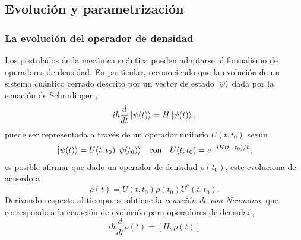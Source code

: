 \subsection{Evolución y parametrización}

\subsubsection{La evolución del operador de densidad}
Los postulados de la mecánica cuántica pueden adaptarse al formalismo de operadores de densidad. En particular, reconociendo que la evolución de un sistema cuántico cerrado descrito por un vector de estado $\ket{\psi}$ dada por la ecuación de Schrodinger \cite{Breuer},
\begin{equation*}
    i\hbar\frac{d}{dt}\ket{\psi(t)}=H\ket{\psi(t)},
\end{equation*}
puede ser representada a través de un operador unitario $U(t,t_{0})$ según
\begin{align*}
    \ket{\psi(t)}=U(t,t_{0})\ket{\psi(t_{0})} && \text{con} && U(t,t_{0})=e^{-iH(t-t_{0})/\hbar}\rlap{,}
\end{align*}
es posible afirmar que dado un operador de densidad $\rho(t_{0})$, este evoluciona de acuerdo a
\begin{equation*}
    \rho(t)=U(t,t_{0})\rho(t_{0})U^{\dagger}(t,t_{0}).
\end{equation*}
Derivando respecto al tiempo, se obtiene la \textit{ecuación de von Neumann}, que corresponde a la ecuación de evolución para operadores de densidad,
\begin{equation}\label{eq:vonNeumann}
    i\hbar\frac{d}{d t} \rho(t)=[H,\rho(t)]
\end{equation}

